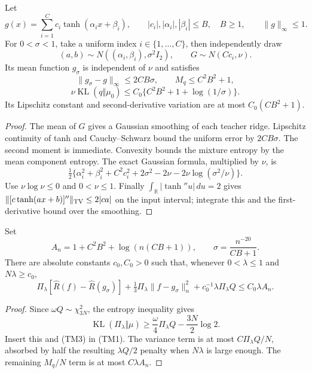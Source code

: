 \begin{lemma}
\label{lem:tanh-teacher-pack}
Let
\[
 g(x)=\sum_{i=1}^C c_i\tanh(\alpha_i x+\beta_i),\qquad
 |c_i|,|\alpha_i|,|\beta_i|\le B,\quad B\ge1,
 \qquad \|g\|_\infty\le1.
\]
For $0<\sigma<1$, take a uniform index $i\in\{1,\ldots,C\}$,
then independently draw
\[
 (a,b)\sim N((\alpha_i,\beta_i),\sigma^2 I_2),\qquad
 G\sim N(Cc_i,\nu).
\]
Its mean function $g_\sigma$ is independent of $\nu$ and satisfies
\[
 \|g_\sigma-g\|_\infty\le2CB\sigma,\qquad M_q\le C^2B^2+1,
\]
\[
 \nu\operatorname{KL}(q\Vert\mu_0)
 \le C_0\{C^2B^2+1+\log(1/\sigma)\}.                    \tag{TM3}
\]
Its Lipschitz constant and second-derivative variation are at most
$C_0(CB^2+1)$.
\end{lemma}
\begin{proof}
The mean of $G$ gives a Gaussian smoothing of each teacher ridge.
Lipschitz continuity of tanh and Cauchy--Schwarz bound the uniform
error by $2CB\sigma$. The second moment is immediate. Convexity bounds
the mixture entropy by the mean component entropy. The exact Gaussian
formula, multiplied by $\nu$, is
\[
 \tfrac12\{\alpha_i^2+\beta_i^2+C^2c_i^2
 +2\sigma^2-2\nu-2\nu\log(\sigma^2/\nu)\}.
\]
Use $\nu\log\nu\le0$ and $0<\nu\le1$.
Finally $\int_{\mathbb R}|\tanh''u|\,du=2$ gives
$\|[c\tanh(ax+b)]''\|_{\rm TV}\le2|ca|$ on the input interval;
integrate this and the first-derivative bound over the smoothing.
\end{proof}

\begin{proposition}
\label{prop:tanh-strong-objective}
Set
\[
 A_n=1+C^2B^2+\log(n(CB+1)),\qquad
 \sigma=\frac{n^{-20}}{CB+1}.
\]
There are absolute constants $c_0,C_0>0$ such that, whenever
$0<\lambda\le1$ and $N\lambda\ge c_0$,
\[
 \Pi_\lambda[\widehat R(f)-\widehat R(g_\sigma)]
 +\tfrac13\Pi_\lambda\|f-g_\sigma\|_n^2
 +c_0^{-1}\lambda\Pi_\lambda Q
 \le C_0\lambda A_n.                                   \tag{TM4}
\]
\end{proposition}
\begin{proof}
Since $\omega Q\sim\chi^2_{3N}$, the entropy inequality gives
\[
 \operatorname{KL}(\Pi_\lambda\Vert\mu)
 \ge\frac{\omega}{4}\Pi_\lambda Q-\frac{3N}{2}\log2.
\]
Insert this and (TM3) in (TM1). The variance term is at most
$C\Pi_\lambda Q/N$, absorbed by half the resulting $\lambda Q/2$
penalty when $N\lambda$ is large enough. The remaining $M_q/N$
term is at most $C\lambda A_n$.
\end{proof}

